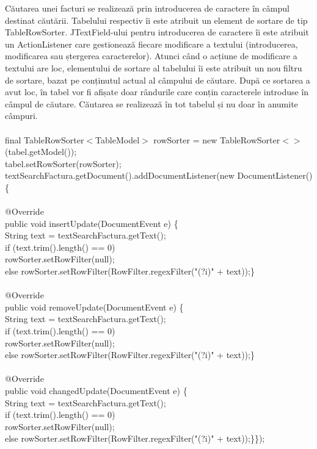 \documentclass[12pt]{book}
\begin{document}
Căutarea unei facturi se realizează prin introducerea de caractere în câmpul destinat căutării. Tabelului respectiv îi este atribuit un element de sortare de tip TableRowSorter. JTextField-ului pentru introducerea de caractere îi este atribuit un ActionListener care gestionează fiecare modificare a textului (introducerea, modificarea sau ștergerea caracterelor). Atunci când o acțiune de modificare a textului are loc, elementului de sortare al tabelului îi este atribuit un nou filtru de sortare, bazat pe conținutul actual al câmpului de căutare. După ce sortarea a avut loc, în tabel vor fi afișate doar rândurile care conțin caracterele introduse în câmpul de căutare. Căutarea se realizează în tot tabelul și nu doar în anumite câmpuri.\\\\
final TableRowSorter$<$TableModel$>$ rowSorter = new TableRowSorter$<>$(tabel.getModel());\\
tabel.setRowSorter(rowSorter);\\
textSearchFactura.getDocument().addDocumentListener(new DocumentListener() \{\\\\
	@Override\\
	public void insertUpdate(DocumentEvent e) \{\\
		String text = textSearchFactura.getText();\\
		if (text.trim().length() == 0)\\
			rowSorter.setRowFilter(null);\\
		else rowSorter.setRowFilter(RowFilter.regexFilter("(?i)" + text));\}\\\\
	@Override\\
	public void removeUpdate(DocumentEvent e) \{\\
		String text = textSearchFactura.getText();\\
		if (text.trim().length() == 0)\\
			rowSorter.setRowFilter(null);\\
		else rowSorter.setRowFilter(RowFilter.regexFilter("(?i)" + text));\}\\\\
	@Override\\
	public void changedUpdate(DocumentEvent e) \{\\
		String text = textSearchFactura.getText();\\
		if (text.trim().length() == 0)\\
			rowSorter.setRowFilter(null);\\
		else rowSorter.setRowFilter(RowFilter.regexFilter("(?i)" + text));\}\});\\
\end{document}
